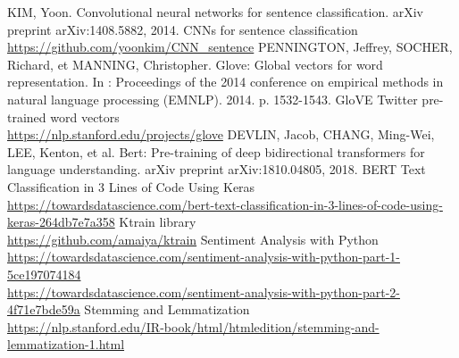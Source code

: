\documentclass[11pt, a4paper, twocolumn]{article}
\begin{document}
\begin{thebibliography}{9}
		KIM, Yoon. Convolutional neural networks for sentence classification. arXiv preprint arXiv:1408.5882, 2014.
		CNNs for sentence classification
		\\\url{https://github.com/yoonkim/CNN\_sentence}
		PENNINGTON, Jeffrey, SOCHER, Richard, et MANNING, Christopher. Glove: Global vectors for word representation. In : Proceedings of the 2014 conference on empirical methods in natural language processing (EMNLP). 2014. p. 1532-1543.
		GloVE Twitter pre-trained word vectors
		\\\url{https://nlp.stanford.edu/projects/glove}
		DEVLIN, Jacob, CHANG, Ming-Wei, LEE, Kenton, et al. Bert: Pre-training of deep bidirectional transformers for language understanding. arXiv preprint arXiv:1810.04805, 2018.
		BERT Text Classification in 3 Lines of Code Using Keras
		\\\url{https://towardsdatascience.com/bert-text-classification-in-3-lines-of-code-using-keras-264db7e7a358}
		Ktrain library
		\\\url{https://github.com/amaiya/ktrain}
		Sentiment Analysis with Python
		\\\url{https://towardsdatascience.com/sentiment-analysis-with-python-part-1-5ce197074184}
		\\\url{https://towardsdatascience.com/sentiment-analysis-with-python-part-2-4f71e7bde59a}
		Stemming and Lemmatization
		\\\url{https://nlp.stanford.edu/IR-book/html/htmledition/stemming-and-lemmatization-1.html}

\end{thebibliography}
\end{document}
